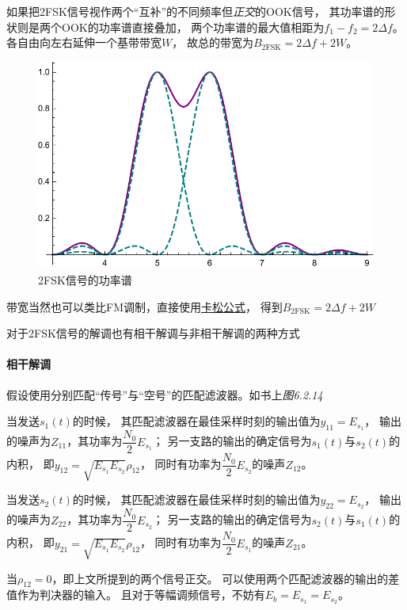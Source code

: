     如果把2FSK信号视作两个“互补”的不同频率但\emph{正交}的OOK信号，
    其功率谱的形状则是两个OOK的功率谱直接叠加，
    两个功率谱的最大值相距为$f_1-f_2=2\Delta f$。各自由向左右延伸一个基带带宽$W$，
    故总的带宽为$B_\text{2FSK}=2\Delta f+2W$。
    \begin{figure}[H]
        \centering
        \includegraphics[scale=0.8]{body/image/2FSKPSD.pdf}
        \caption{2FSK信号的功率谱}
    \end{figure}
    带宽当然也可以类比FM调制，直接使用\hyperref[eq:Carson]{卡松公式}，
    得到$B_\text{2FSK}=2\Delta f+2W$

    对于2FSK信号的解调也有相干解调与非相干解调的两种方式
    
    \paragraph{相干解调}\mbox{}

    假设使用分别匹配“传号”与“空号”的匹配滤波器。如书上\emph{图6.2.14}
    
    当发送$s_1(t)$的时候，
    其匹配滤波器在最佳采样时刻的输出值为$y_{11}=E_{s_1}$，
    输出的噪声为$Z_{11}$，其功率为$\dfrac{N_0}{2}E_{s_1}$；
    另一支路的输出的确定信号为$s_1(t)$与$s_2(t)$的内积，
    即$y_{12}=\sqrt{E_{s_1}E_{s_2}}\rho_{12}$，
    同时有功率为$\dfrac{N_0}{2}E_{s_2}$的噪声$Z_{12}$。

    当发送$s_2(t)$的时候，
    其匹配滤波器在最佳采样时刻的输出值为$y_{22}=E_{s_2}$，
    输出的噪声为$Z_{22}$，其功率为$\dfrac{N_0}{2}E_{s_2}$；
    另一支路的输出的确定信号为$s_2(t)$与$s_1(t)$的内积，
    即$y_{21}=\sqrt{E_{s_1}E_{s_2}}\rho_{12}$，
    同时有功率为$\dfrac{N_0}{2}E_{s_1}$的噪声$Z_{21}$。

    当$\rho_{12}=0$，即上文所提到的两个信号正交。
    可以使用两个匹配滤波器的输出的差值作为判决器的输入。
    且对于等幅调频信号，不妨有$E_b=E_{s_1}=E_{s_2}$。
    
